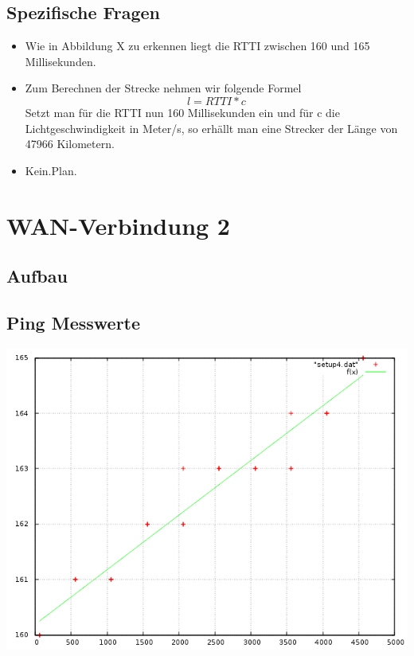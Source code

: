 \documentclass[a4paper,10pt]{article}
\begin{document}
\subsection{Spezifische Fragen}
\begin{itemize}
 \item Wie in Abbildung X zu erkennen liegt die RTTI zwischen 160 und 165 Millisekunden.
 \item {Zum Berechnen der Strecke nehmen wir folgende Formel
 \begin{equation}
  l=RTTI*c
 \end{equation}
 Setzt man für die RTTI nun 160 Millisekunden ein und für c die Lichtgeschwindigkeit in Meter/s,
 so erhällt man eine Strecker der Länge von 47966 Kilometern.}
 \item Kein.Plan.
\end{itemize}

\section{WAN-Verbindung 2}

\subsection{Aufbau}

\subsection{Ping Messwerte}
\includegraphics[scale=0.75]{ping_setup_wan2.png}
\end{document}
